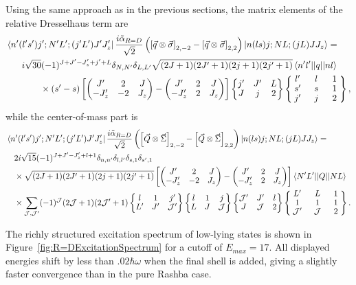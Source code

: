 \documentclass[%
 onecolumn,
 notitlepage,
 amsmath,amssymb,
 aps,
]{revtex4-1}
\newcommand{\threej}[6]{ \begin{pmatrix}
  #1 & #2 & #3 \\
  #4 & #5 & #6 
 \end{pmatrix}}
\newcommand{\sixj}[6]{ \begin{Bmatrix}
  #1 & #2 & #3 \\
  #4 & #5 & #6 
 \end{Bmatrix}}
\newcommand{\ninej}[9]{ \begin{Bmatrix}
  #1 & #2 & #3 \\
  #4 & #5 & #6 \\
  #7 & #8 & #9
 \end{Bmatrix}}
\begin{document}
Using the same approach as in the previous sections, the matrix elements of the relative Dresselhaus term are
\begin{equation}\begin{split}
&\bra{n'(l's')j';N'L';(j'L')J'J'_z} \frac{i \tilde{\alpha}_{R=D}}{\sqrt{2}}\left(  \left[ \vec{q} \otimes \vec{\sigma} \right]_{2,-2} -  \left[ \vec{q} \otimes \vec{\sigma} \right]_{2,2} \right)  \ket{n(ls)j;NL;(jL)JJ_z} = \\
 &\quad\hphantom{\times} i \sqrt{30}(-1)^{J+J'-J'_z+j'+L}\delta_{N,N'}\delta_{L,L'} \sqrt{(2J+1)(2J'+1)(2j+1)(2j'+1)}  \braket{n'l' || q || n l}\\
 &\hspace{1cm}\quad \times(s'-s) \left[\threej{J'}{2}{J}{-J'_z}{-2}{J_z}-\threej{J'}{2}{J}{-J'_z}{2}{J_z}\right] \sixj{j'}{J'}{L}{J}{j}{2}
 \renewcommand{\arraystretch}{0.9} \ninej{\hphantom{l}l'\hphantom{l}}{\hphantom{l}l\hphantom{l}}{\hphantom{l}1\hphantom{l}}{s'}{s}{1}{j'}{j}{2},
\end{split}
\end{equation}
while the center-of-mass part is 
\begin{equation}\begin{split}
&\bra{n'(l's')j';N'L';(j'L')J'J'_z}  \frac{i \tilde{\alpha}_{R=D}}{\sqrt{2}}\left(  \left[ \vec{Q} \otimes \vec{\Sigma} \right]_{2,-2} -  \left[ \vec{Q} \otimes \vec{\Sigma} \right]_{2,2} \right)  \ket{n(ls)j;NL;(jL)JJ_z} =  \\
&\quad2 i \sqrt{15}(-1)^{J+J'-J'_z+l+1}\delta_{n,n'}\delta_{l,l'}\delta_{s,1}\delta_{s',1}  \\
 &\quad\times \sqrt{(2J+1)(2J'+1)(2j+1)(2j'+1)} \left[\threej{J'}{2}{J}{-J'_z}{-2}{J_z}-\threej{J'}{2}{J}{-J'_z}{2}{J_z}\right] \braket{N' L' || Q || N L} \\ 
 &\quad\times\sum_{\mathcal{J},\mathcal{J}'} (-1)^\mathcal{J}(2\mathcal{J}+1)(2\mathcal{J}'+1)\sixj{l}{1}{j'}{L'}{J'}{\mathcal{J}'}\sixj{l}{1}{j}{L}{J}{\mathcal{J}}\sixj{\mathcal{J}'}{J'}{l}{J}{\mathcal{J}}{2}
 \renewcommand{\arraystretch}{0.9}
 \ninej{\hphantom{l}L'\hphantom{l}}{\hphantom{l}L\hphantom{l}}{\hphantom{l}1\hphantom{l}}{1}{1}{1}{\mathcal{J}'}{\mathcal{J}}{2} .
\end{split}
\end{equation}

The richly structured excitation spectrum of low-lying states is shown in Figure~\ref{fig:R=DExcitationSpectrum} for a cutoff of $E_{max}=17$. All displayed energies shift by less than .$02\hbar\omega$ when the final shell is added, giving a slightly faster convergence than in the pure Rashba case.
\end{document}
